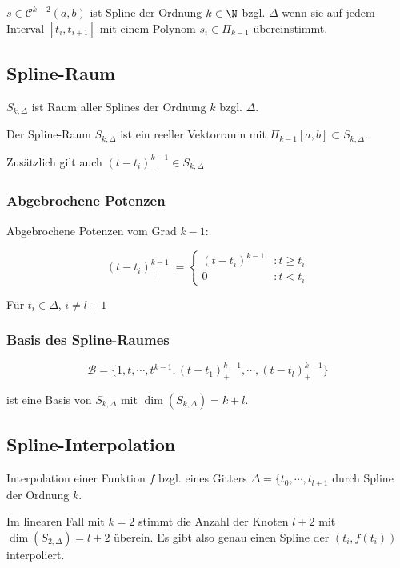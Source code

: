 $s \in \mathcal{C}^{k-2}(a,b)$ ist Spline der Ordnung $k \in \N$ bzgl. $\Delta$ wenn sie auf jedem Interval $[t_i,t_{i+1}]$ mit einem Polynom $s_i \in \Pi_{k-1}$ übereinstimmt.

\subsection*{Spline-Raum}

$S_{k,\Delta}$ ist Raum aller Splines der Ordnung $k$ bzgl. $\Delta$.

Der Spline-Raum $S_{k,\Delta}$ ist ein reeller Vektorraum mit $\Pi_{k-1}[a,b] \subset S_{k,\Delta}$.

Zusätzlich gilt auch $(t-t_i)_+^{k-1} \in S_{k,\Delta}$

\subsubsection*{Abgebrochene Potenzen}

Abgebrochene Potenzen vom Grad $k-1$:

$$(t-t_i)_+^{k-1} := \begin{cases}(t-t_i)^{k-1} &: t \geq t_i \\ 0 &: t < t_i\end{cases}$$

Für $t_i \in \Delta$, $i \neq l+1$

\subsubsection*{Basis des Spline-Raumes}

$$\mathcal{B} = \{1,t,\cdots,t^{k-1},(t-t_1)_+^{k-1},\cdots,(t-t_l)_+^{k-1}\}$$

ist eine Basis von $S_{k,\Delta}$ mit $\dim(S_{k,\Delta}) = k + l$.

\subsection*{Spline-Interpolation}

Interpolation einer Funktion $f$ bzgl. eines Gitters $\Delta = \{t_0,\cdots,t_{l+1}$ durch Spline der Ordnung $k$.

\vspace{2mm}

Im linearen Fall mit $k=2$ stimmt die Anzahl der Knoten $l+2$ mit $\dim(S_{2,\Delta})=l+2$ überein. Es gibt also genau einen Spline der $(t_i,f(t_i))$ interpoliert.

